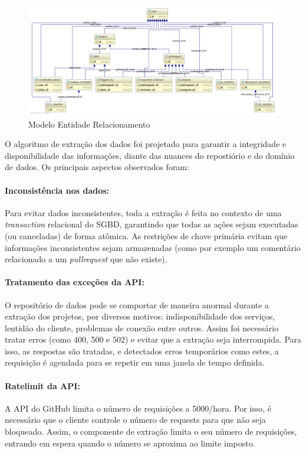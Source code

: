 \documentclass[peerreview]{acmart}
\begin{document}
\begin{figure}[!htbp]
 \includegraphics[width=\textwidth]{mer}
 \caption{Modelo Entidade Relacionamento}\label{fig:mer}
\end{figure}

O algoritmo de extração dos dados foi projetado para garantir a integridade e disponibilidade das informações, diante das nuances do repostiório e do domínio de dados. Os principais aspectos observados foram:

\paragraph{Inconsistência nos dados: } Para evitar dados inconsistentes, toda a extração é feita no contexto de uma \textit{transaction} relacional do SGBD, garantindo que todas as ações sejam executadas (ou canceladas) de forma atômica. As restrições de chave primária evitam que informações inconsistentes sejam armazenadas (como por exemplo um comentário relacionado a um \textit{pullrequest} que não existe).

\paragraph{Tratamento das exceções da API: } O repositório de dados pode se comportar de maneira anormal durante a extração dos projetos, por diversos motivos: indisponibilidade dos serviços, lentidão do cliente, problemas de conexão entre outros. Assim foi necessário tratar erros (como 400, 500 e 502) e evitar que a extração seja interrompida. Para isso, as respostas são tratadas, e detectados erros temporários como estes, a requisição é agendada para se repetir em uma janela de tempo definida.

\paragraph{Ratelimit da API: } A API do GitHub limita o número de requisições a 5000/hora. Por isso, é necessário que o cliente controle o número de requests para que não seja bloqueado. Assim, o componente de extração limita o seu número de requisições, entrando em espera quando o número se aproxima ao limite imposto.
\end{document}
